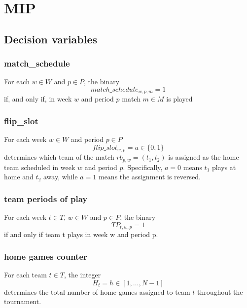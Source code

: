 \section{MIP}
\subsection{Decision variables}
\subsubsection{match\_schedule}
For each $w \in W$ and $p \in P$, the binary
$$
match\_schedule_{w,p,m} = 1
$$
if, and only if, in week $w$ and period $p$ match $m \in M$ is played 

\subsubsection{flip\_slot}
For each week $w \in W$ and period $p \in P$  
$$  
flip\_slot_{w,p} = a \in \{0, 1\}  
$$  
determines which team of the match $rb_{p, w} = (t_1, t_2)$ is assigned as the home team scheduled in week $w$ and period $p$. Specifically, $a = 0$ means $t_1$ plays at home and $t_2$ away, while $a = 1$ means the assignment is reversed.

\subsubsection{team periods of play}
For each week $t \in T$, $w \in W$ and $p \in P$, the binary
$$
TP_{t,w,p} = 1
$$
if and only if team t plays in week w and period p.

\subsubsection{home games counter}
For each team $t \in T$, the integer  
$$  
H_t = h \in [1, \dots, N-1]
$$  
determines the total number of home games assigned to team $t$ throughout the tournament.%

